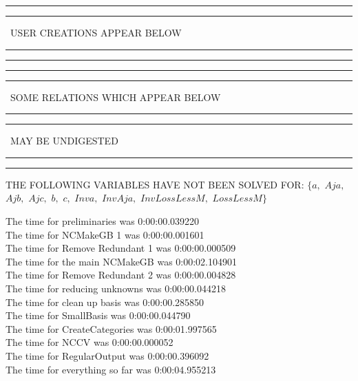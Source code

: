 \documentclass[rep10,leqno]{report}
\begin{document}
\rule[2pt]{6in}{1pt}\hfil\break
\rule[2.5pt]{1.701in}{1pt}
\ USER CREATIONS APPEAR BELOW\ 
\rule[2.5pt]{1.701in}{1pt}\hfil\break
\rule[2pt]{6in}{1pt}\hfil\break
\rule[2pt]{6in}{4pt}\hfil\break
\rule[2pt]{1.45in}{4pt}
\ SOME RELATIONS WHICH APPEAR BELOW\ 
\rule[2pt]{1.45in}{4pt}\hfil\break
\rule[2pt]{2.18in}{4pt}
\ MAY BE UNDIGESTED\ 
\rule[2pt]{2.18in}{4pt}\hfil\break
\rule[2pt]{6in}{4pt}\hfil\break
THE FOLLOWING VARIABLES HAVE NOT BEEN SOLVED FOR:\hfil\break
$\{a,
$ $
Aja,
$ $
Ajb,
$ $
Ajc,
$ $
b,
$ $
c,
$ $
Inva,
$ $
InvAja,
$ $
InvLossLessM,
$ $
LossLessM\}$
\smallskip\\
\vspace{10pt}

\noindent
The time for preliminaries was 0:00:00.039220\\
The time for NCMakeGB 1 was 0:00:00.001601\\
The time for Remove Redundant 1 was 0:00:00.000509\\
The time for the main NCMakeGB was 0:00:02.104901\\
The time for Remove Redundant 2 was 0:00:00.004828\\
The time for reducing unknowns was 0:00:00.044218\\
The time for clean up basis was 0:00:00.285850\\
The time for SmallBasis was 0:00:00.044790\\
The time for CreateCategories was 0:00:01.997565\\
The time for NCCV was 0:00:00.000052\\
The time for RegularOutput was 0:00:00.396092\\
The time for everything so far was 0:00:04.955213\\
\end{document}
